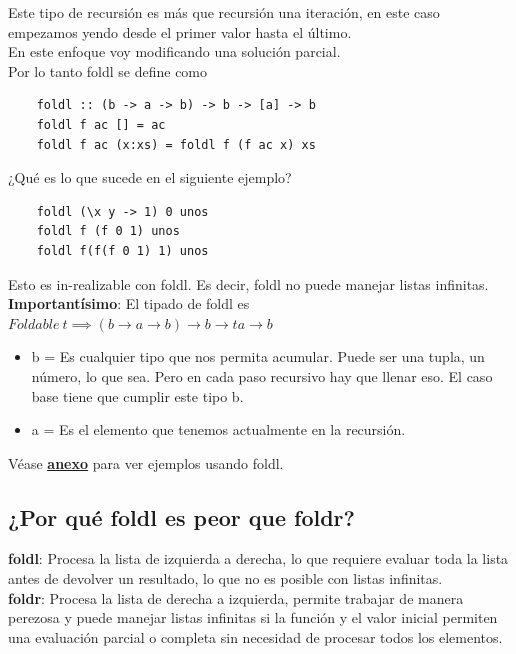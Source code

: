 \documentclass[10pt,a4paper]{article}
\begin{document}
Este tipo de recursión es más que recursión una iteración, en este caso empezamos yendo desde el primer valor hasta el último. \\
En este enfoque voy modificando una solución parcial. \\
Por lo tanto foldl se define como
\begin{lstlisting}
    foldl :: (b -> a -> b) -> b -> [a] -> b 
    foldl f ac [] = ac
    foldl f ac (x:xs) = foldl f (f ac x) xs
\end{lstlisting}
¿Qué es lo que sucede en el siguiente ejemplo? \\
\begin{lstlisting}
    foldl (\x y -> 1) 0 unos
    foldl f (f 0 1) unos
    foldl f(f(f 0 1) 1) unos
\end{lstlisting}
Esto es in-realizable con foldl. Es decir, foldl no puede manejar listas infinitas. \\
\textbf{Importantísimo}: El tipado de foldl es $ Foldable \ t  \implies (b \rightarrow a \rightarrow b) \rightarrow b \rightarrow t a \rightarrow b $
\begin{itemize}
    \item b = Es cualquier tipo que nos permita acumular. Puede ser una tupla, un número, lo que sea. Pero en cada paso recursivo hay que llenar eso. El caso base tiene que cumplir este tipo b.
    \item a = Es el elemento que tenemos actualmente en la recursión.
\end{itemize}
Véase \hyperref[subsec:foldl_ejercicios]{\underline{\textbf{anexo}}} para ver ejemplos usando foldl.
\subsection*{¿Por qué foldl es peor que foldr?}
\textbf{foldl}: Procesa la lista de izquierda a derecha, lo que requiere evaluar toda la lista antes de devolver un resultado, lo que no es posible con listas infinitas. \\
\textbf{foldr}: Procesa la lista de derecha a izquierda, permite trabajar de manera perezosa y puede manejar listas infinitas si la función y el valor inicial permiten una evaluación parcial o completa sin necesidad de procesar todos los elementos.
\end{document}
